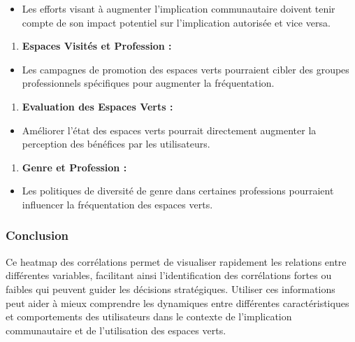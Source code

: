 \documentclass[
]{article}
\providecommand{\tightlist}{%
  \setlength{\itemsep}{0pt}\setlength{\parskip}{0pt}}
\begin{document}
\begin{itemize}
\tightlist
\item
  Les efforts visant à augmenter l'implication communautaire doivent
  tenir compte de son impact potentiel sur l'implication autorisée et
  vice versa.
\end{itemize}

\begin{enumerate}
\def\labelenumi{\arabic{enumi}.}
\setcounter{enumi}{1}
\tightlist
\item
  \textbf{Espaces Visités et Profession :}
\end{enumerate}

\begin{itemize}
\tightlist
\item
  Les campagnes de promotion des espaces verts pourraient cibler des
  groupes professionnels spécifiques pour augmenter la fréquentation.
\end{itemize}

\begin{enumerate}
\def\labelenumi{\arabic{enumi}.}
\setcounter{enumi}{2}
\tightlist
\item
  \textbf{Evaluation des Espaces Verts :}
\end{enumerate}

\begin{itemize}
\tightlist
\item
  Améliorer l'état des espaces verts pourrait directement augmenter la
  perception des bénéfices par les utilisateurs.
\end{itemize}

\begin{enumerate}
\def\labelenumi{\arabic{enumi}.}
\setcounter{enumi}{3}
\tightlist
\item
  \textbf{Genre et Profession :}
\end{enumerate}

\begin{itemize}
\tightlist
\item
  Les politiques de diversité de genre dans certaines professions
  pourraient influencer la fréquentation des espaces verts.
\end{itemize}

\subsubsection{Conclusion}\label{conclusion-11}

Ce heatmap des corrélations permet de visualiser rapidement les
relations entre différentes variables, facilitant ainsi l'identification
des corrélations fortes ou faibles qui peuvent guider les décisions
stratégiques. Utiliser ces informations peut aider à mieux comprendre
les dynamiques entre différentes caractéristiques et comportements des
utilisateurs dans le contexte de l'implication communautaire et de
l'utilisation des espaces verts.
\end{document}
